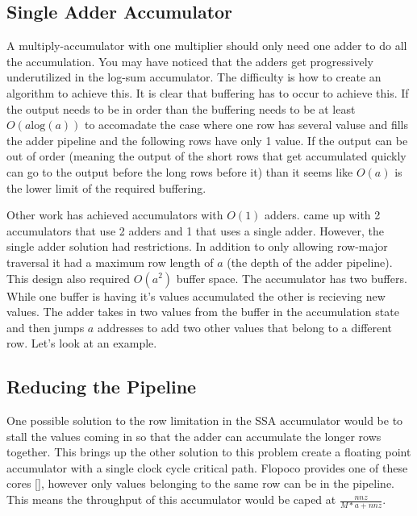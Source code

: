\subsection{Single Adder Accumulator}
A multiply-accumulator with one multiplier should only need one adder to do all the accumulation. You may have noticed that the adders get progressively underutilized in the log-sum accumulator. The difficulty is how to create an algorithm to achieve this. It is clear that buffering has to occur to achieve this. If the output needs to be in order than the buffering needs to be at least $O(a\textrm{log}(a))$ to accomadate the case where one row has several valuse and fills the adder pipeline and the following rows have only 1 value. If the output can be out of order (meaning the output of the short rows that get accumulated quickly can go to the output before the long rows before it) than it seems like $O(a)$ is the lower limit of the required buffering.

Other work has achieved accumulators with $O(1)$ adders. \cite{prelim:zhuo} came up with 2 accumulators that use 2 adders and 1 that uses a single adder. However, the single adder solution had restrictions. In addition to only allowing row-major traversal it had a maximum row length of $a$ (the depth of the adder pipeline). This design also required $O(a^2)$ buffer space. The accumulator has two buffers. While one buffer is having it's values accumulated the other is recieving new values. The adder takes in two values from the buffer in the accumulation state and then jumps $a$ addresses to add two other values that belong to a different row. Let's look at an example.

\subsection{Reducing the Pipeline}
One possible solution to the row limitation in the SSA accumulator would be to stall the values coming in so that the adder can accumulate the longer rows together. This brings up the other solution to this problem create a floating point accumulator with a single clock cycle critical path. Flopoco provides one of these cores [\cite{prelim:deDinechin3}], however only values belonging to the same row can be in the pipeline. This means the throughput of this accumulator would be caped at $\frac{nnz}{M*a + nnz}$.


